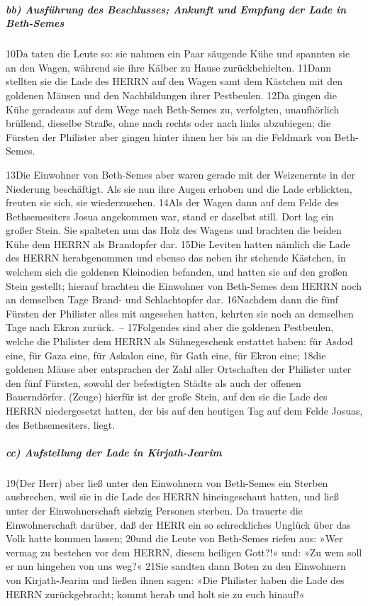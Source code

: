 \hypertarget{bb-ausfuxfchrung-des-beschlusses-ankunft-und-empfang-der-lade-in-beth-semes}{%
\subparagraph{bb) Ausführung des Beschlusses; Ankunft und Empfang der
Lade in
Beth-Semes}\label{bb-ausfuxfchrung-des-beschlusses-ankunft-und-empfang-der-lade-in-beth-semes}}

10Da taten die Leute so: sie nahmen ein Paar säugende Kühe und spannten
sie an den Wagen, während sie ihre Kälber zu Hause zurückbehielten.
11Dann stellten sie die Lade des HERRN auf den Wagen samt dem Kästchen
mit den goldenen Mäusen und den Nachbildungen ihrer Pestbeulen. 12Da
gingen die Kühe geradeaus auf dem Wege nach Beth-Semes zu, verfolgten,
unaufhörlich brüllend, dieselbe Straße, ohne nach rechts oder nach links
abzubiegen; die Fürsten der Philister aber gingen hinter ihnen her bis
an die Feldmark von Beth-Semes.

13Die Einwohner von Beth-Semes aber waren gerade mit der Weizenernte in
der Niederung beschäftigt. Als sie nun ihre Augen erhoben und die Lade
erblickten, freuten sie sich, sie wiederzusehen. 14Als der Wagen dann
auf dem Felde des Bethsemesiters Josua angekommen war, stand er daselbst
still. Dort lag ein großer Stein. Sie spalteten nun das Holz des Wagens
und brachten die beiden Kühe dem HERRN als Brandopfer dar. 15Die Leviten
hatten nämlich die Lade des HERRN herabgenommen und ebenso das neben ihr
stehende Kästchen, in welchem sich die goldenen Kleinodien befanden, und
hatten sie auf den großen Stein gestellt; hierauf brachten die Einwohner
von Beth-Semes dem HERRN noch an demselben Tage Brand- und Schlachtopfer
dar. 16Nachdem dann die fünf Fürsten der Philister alles mit angesehen
hatten, kehrten sie noch an demselben Tage nach Ekron zurück.~--
17Folgendes sind aber die goldenen Pestbeulen, welche die Philister dem
HERRN als Sühnegeschenk erstattet haben: für Asdod eine, für Gaza eine,
für Askalon eine, für Gath eine, für Ekron eine; 18die goldenen Mäuse
aber entsprachen der Zahl aller Ortschaften der Philister unter den fünf
Fürsten, sowohl der befestigten Städte als auch der offenen
Bauerndörfer. (Zeuge) hierfür ist der große Stein, auf den sie die Lade
des HERRN niedergesetzt hatten, der bis auf den heutigen Tag auf dem
Felde Josuas, des Bethsemesiters, liegt.

\hypertarget{cc-aufstellung-der-lade-in-kirjath-jearim}{%
\subparagraph{cc) Aufstellung der Lade in
Kirjath-Jearim}\label{cc-aufstellung-der-lade-in-kirjath-jearim}}

19(Der Herr) aber ließ unter den Einwohnern von Beth-Semes ein Sterben
ausbrechen, weil sie in die Lade des HERRN hineingeschaut hatten, und
ließ unter der Einwohnerschaft siebzig Personen sterben. Da trauerte die
Einwohnerschaft darüber, daß der HERR ein so schreckliches Unglück über
das Volk hatte kommen lassen; 20und die Leute von Beth-Semes riefen aus:
»Wer vermag zu bestehen vor dem HERRN, diesem heiligen Gott?!« und: »Zu
wem soll er nun hingehen von uns weg?« 21Sie sandten dann Boten zu den
Einwohnern von Kirjath-Jearim und ließen ihnen sagen: »Die Philister
haben die Lade des HERRN zurückgebracht; kommt herab und holt sie zu
euch hinauf!«

